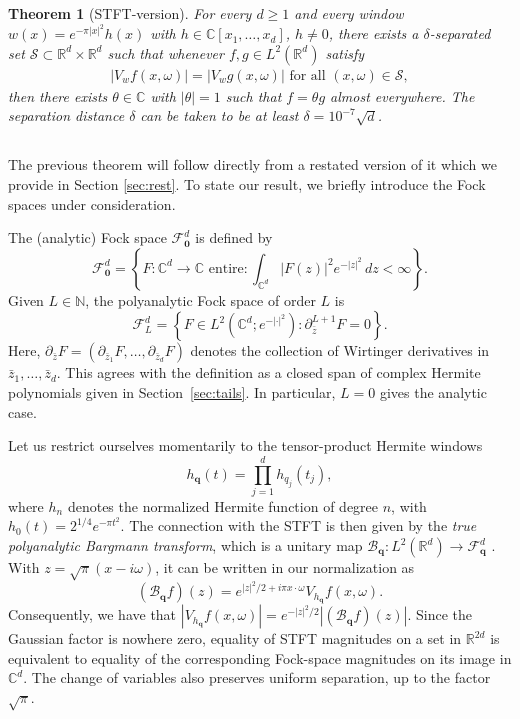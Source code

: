 \documentclass[11pt]{amsart}
\newtheorem{theorem}{Theorem}[section]
\newcommand{\C}{\mathbb C}
\newcommand{\R}{\mathbb R}
\newcommand{\F}{\mathcal F}
\newcommand{\dd}{\,d}
\begin{document}
\begin{theorem}[STFT-version]\label{thm:STFT}
For every \(d\ge 1\) and every window $w(x) = e^{-\pi |x|^2} h(x)$ with $h \in \mathbb C[x_1,\ldots,x_d]$, $h \neq 0$, there exists a $\delta$-separated set \(\mathcal S \subset \R^d \times \R^d\) such that whenever $f,g \in L^2(\mathbb R^d)$ satisfy
\begin{align*}
    |V_w f (x,\omega)| = |V_w g (x,\omega)| \text{ for all } (x,\omega) \in \mathcal S,
\end{align*}
then there exists $\theta \in \mathbb C$ with $|\theta| = 1$ such that $f = \theta g$ almost everywhere. The separation distance $\delta$ can be taken to be at least $\delta = 10^{-7} \sqrt{d}$.
\end{theorem}

\subsection{}
The previous theorem will follow directly from a restated version of it which we provide in Section \ref{sec:rest}. To state our result, we briefly introduce the Fock spaces under consideration.

The (analytic) Fock space $\F^d_{\mathbf 0}$ is defined by
$$
    \F^d_{\mathbf 0}
    = \left\{F:\C^d\to\C \text{ entire}:
    \int_{\C^d}|F(z)|^2e^{-|z|^2}\dd z<\infty\right\}.
$$
Given $L \in \mathbb N$, the polyanalytic Fock space of order $L$ is
\begin{equation}\label{eq:intro_true_fock}
    \F^d_{L}
    = \left\{ F \in L^2(\mathbb C^d; e^{-|\cdot|^2} ): \partial_{\bar z}^{L+1} F = 0 \right\}.
\end{equation}
Here, $\partial_{\bar z} F = (\partial_{\bar z_1} F, \ldots, \partial_{\bar z_d} F)$ denotes the collection of Wirtinger derivatives in $\bar z_1,\ldots,\bar z_d$. This agrees with the definition as a closed span of complex Hermite polynomials given in Section~\ref{sec:tails}. In particular, $L = 0$ gives the analytic case.

Let us restrict ourselves momentarily to the tensor-product Hermite windows $$h_{\mathbf q}(t)=\prod_{j=1}^d h_{q_j}(t_j),$$ where $h_n$ denotes the normalized Hermite function of degree $n$, with $h_0(t)=2^{1/4}e^{-\pi t^2}$.
The connection with the STFT is then given by the \emph{true polyanalytic Bargmann transform}, which is a unitary map $\mathcal B_{\mathbf q}:L^2(\R^d)\to\F^d_{\mathbf q}$ \cite[Section 3]{Abreu2010}. With $z=\sqrt\pi(x-i\omega)$, it can be written in our normalization as
\begin{equation*}
    (\mathcal B_{\mathbf q}f)(z)
    = e^{|z|^2/2+i\pi x\cdot\omega}V_{h_{\mathbf q}}f(x,\omega).
\end{equation*}
Consequently, we have that
$
    |V_{h_{\mathbf q}}f(x,\omega)|
    = e^{-|z|^2/2}|(\mathcal B_{\mathbf q}f)(z)|.
$
Since the Gaussian factor is nowhere zero, equality of STFT magnitudes on a set in $\R^{2d}$ is equivalent to equality of the corresponding Fock-space magnitudes on its image in $\C^d$. The change of variables also preserves uniform separation, up to the factor $\sqrt\pi$.
\end{document}
